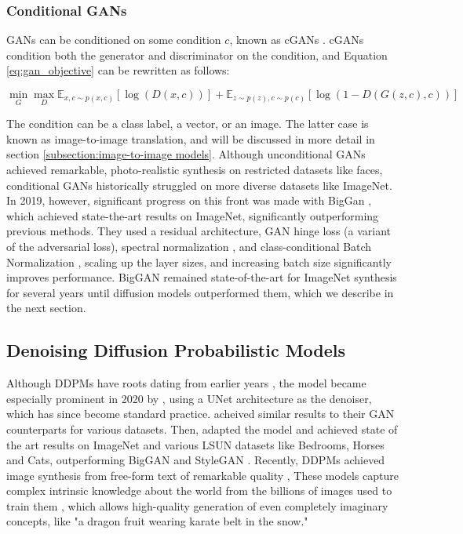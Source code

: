 \subsubsection{Conditional GANs}
\ac{GAN}s can be conditioned on some condition $c$, known as \ac{cGAN}s \citep{mirza2014conditional}.
\ac{cGAN}s condition both the generator and discriminator on the condition, and Equation \ref{eq:gan_objective}
can be rewritten as follows:

\begin{equation}\label{eq:gan_objective}
      \min_{G}\max_{D}\mathbb{E}_{x, c\sim p(x, c)}[\log(D(x, c))] + \mathbb{E}_{z\sim p(z), c\sim p(c)}[\log(1 - D(G(z, c), c))]
\end{equation}

The condition can be a class label, a vector, or an image. The latter case is known as image-to-image translation,
and will be discussed in more detail in section \ref{subsection:image-to-image models}.
Although unconditional \ac{GAN}s achieved remarkable, photo-realistic synthesis on restricted datasets
like faces, conditional  \ac{GAN}s historically struggled on more diverse datasets like ImageNet. 
In 2019, however, significant progress on this front was made with BigGan \citep{brock2018large}, 
which achieved state-the-art results on ImageNet, significantly outperforming previous methods. They 
used a residual architecture, \ac{GAN} hinge loss \citep{lim2017geometric} (a variant of the adversarial loss),
 spectral normalization \citep{miyato2018spectral},
and class-conditional Batch Normalization \cite{ioffe2015batch}, scaling up the layer sizes, 
and increasing 
batch size significantly improves performance. BigGAN remained state-of-the-art for
 ImageNet synthesis 
for several years until diffusion models outperformed them, which we describe in the
 next section. 



\subsection{Denoising Diffusion Probabilistic Models}\label{sec:diffusion:models}

Although \ac{DDPM}s have roots dating from earlier years \citep{sohl2015deep}, the model became 
especially prominent in 2020 by \cite{ho2020denoising}, using a UNet architecture 
as the denoiser, which has since become standard practice. \cite{ho2020denoising} acheived 
similar results to their 
\ac{GAN} counterparts for various datasets. Then, \cite{dhariwal2021diffusion} adapted 
the model and achieved state of the art results on ImageNet and various LSUN datasets like 
Bedrooms, Horses and Cats, outperforming BigGAN \citep{brock2018large} and StyleGAN \citep{karra2020stylegan2}. 
Recently, \ac{DDPM}s achieved image synthesis from free-form text of remarkable quality \citep{ramesh2022hierarchical, nichol2021glide, saharia2022photorealistic, gafni2022make, rombach2022high}, 
These models capture complex intrinsic knowledge about the world from the billions of images used to train them \citep{schuhmann2022laion}, which 
allows high-quality generation of even completely imaginary concepts, like "a dragon fruit wearing karate belt in the snow."

